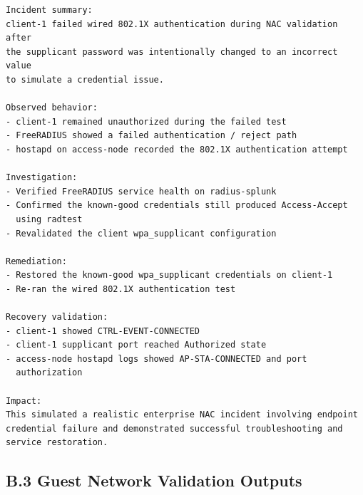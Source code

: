 \documentclass[11pt]{article}
\begin{document}
\begin{verbatim}
Incident summary:
client-1 failed wired 802.1X authentication during NAC validation after
the supplicant password was intentionally changed to an incorrect value
to simulate a credential issue.

Observed behavior:
- client-1 remained unauthorized during the failed test
- FreeRADIUS showed a failed authentication / reject path
- hostapd on access-node recorded the 802.1X authentication attempt

Investigation:
- Verified FreeRADIUS service health on radius-splunk
- Confirmed the known-good credentials still produced Access-Accept
  using radtest
- Revalidated the client wpa_supplicant configuration

Remediation:
- Restored the known-good wpa_supplicant credentials on client-1
- Re-ran the wired 802.1X authentication test

Recovery validation:
- client-1 showed CTRL-EVENT-CONNECTED
- client-1 supplicant port reached Authorized state
- access-node hostapd logs showed AP-STA-CONNECTED and port
  authorization

Impact:
This simulated a realistic enterprise NAC incident involving endpoint
credential failure and demonstrated successful troubleshooting and
service restoration.
\end{verbatim}


\subsection{B.3 Guest Network Validation Outputs}
\label{sec:appendix-b-guest-network-validation-outputs}

\end{document}
